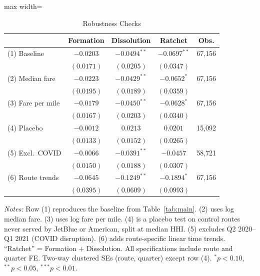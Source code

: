 \begin{table}[H]
\centering
\caption{Robustness Checks}
\label{tab:robustness}
\begin{threeparttable}
\begin{adjustbox}{max width=\textwidth}
\begin{tabular}{lcccc}
\toprule
 & Formation & Dissolution & Ratchet & Obs. \\
\midrule
(1) Baseline & $-0.0203$ & $-0.0494^{**}$ & $-0.0697^{**}$ & 67,156 \\
 & $(0.0171)$ & $(0.0205)$ & $(0.0347)$ & \\
(2) Median fare & $-0.0223$ & $-0.0429^{**}$ & $-0.0652^{*}$ & 67,156 \\
 & $(0.0195)$ & $(0.0189)$ & $(0.0359)$ & \\
(3) Fare per mile & $-0.0179$ & $-0.0450^{**}$ & $-0.0628^{*}$ & 67,156 \\
 & $(0.0167)$ & $(0.0203)$ & $(0.0340)$ & \\
(4) Placebo & $-0.0012$ & $0.0213$ & $0.0201$ & 15,092 \\
 & $(0.0133)$ & $(0.0152)$ & $(0.0265)$ & \\
(5) Excl.\ COVID & $-0.0066$ & $-0.0391^{**}$ & $-0.0457$ & 58,721 \\
 & $(0.0150)$ & $(0.0188)$ & $(0.0307)$ & \\
(6) Route trends & $-0.0645$ & $-0.1249^{**}$ & $-0.1894^{*}$ & 67,156 \\
 & $(0.0395)$ & $(0.0609)$ & $(0.0993)$ & \\
\bottomrule
\end{tabular}
\end{adjustbox}
\begin{tablenotes}[flushleft]
\small
\item \textit{Notes:} Row (1) reproduces the baseline from Table~\ref{tab:main}. (2) uses log median fare. (3) uses log fare per mile. (4) is a placebo test on control routes never served by JetBlue or American, split at median HHI. (5) excludes Q2 2020--Q1 2021 (COVID disruption). (6) adds route-specific linear time trends. ``Ratchet'' = Formation + Dissolution. All specifications include route and quarter FE. Two-way clustered SEs (route, quarter) except row (4). $^{*} p<0.10$, $^{**} p<0.05$, $^{***} p<0.01$.
\end{tablenotes}
\end{threeparttable}
\end{table}

